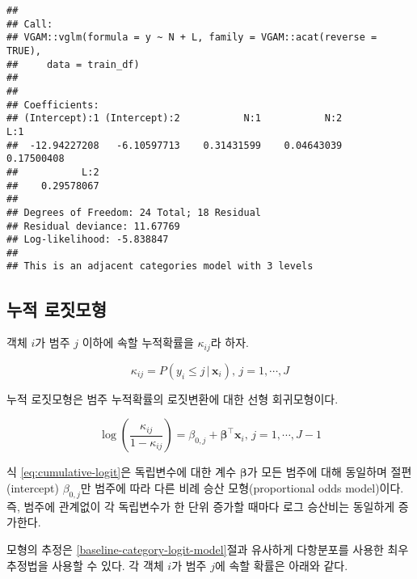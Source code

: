 \documentclass[]{book}
\begin{document}
\begin{verbatim}
## 
## Call:
## VGAM::vglm(formula = y ~ N + L, family = VGAM::acat(reverse = TRUE), 
##     data = train_df)
## 
## 
## Coefficients:
## (Intercept):1 (Intercept):2           N:1           N:2           L:1 
##  -12.94227208   -6.10597713    0.31431599    0.04643039    0.17500408 
##           L:2 
##    0.29578067 
## 
## Degrees of Freedom: 24 Total; 18 Residual
## Residual deviance: 11.67769 
## Log-likelihood: -5.838847 
## 
## This is an adjacent categories model with 3 levels
\end{verbatim}

\hypertarget{cumulative-logit-model}{%
\subsection{누적 로짓모형}\label{cumulative-logit-model}}

객체 \(i\)가 범주 \(j\) 이하에 속할 누적확률을 \(\kappa_{ij}\)라 하자.

\begin{equation*}
\kappa_{ij} = P(y_i \leq j \, | \, \mathbf{x}_i), \, j = 1, \cdots, J
\end{equation*}

누적 로짓모형은 범주 누적확률의 로짓변환에 대한 선형 회귀모형이다.

\begin{equation}
\log \left( \frac{\kappa_{ij}}{1 - \kappa_{ij}} \right) = \beta_{0,j} + \boldsymbol\beta^\top \mathbf{x}_i, \, j = 1, \cdots, J - 1
\label{eq:cumulative-logit}
\end{equation}

식 \eqref{eq:cumulative-logit}은 독립변수에 대한 계수 \(\boldsymbol\beta\)가 모든 범주에 대해 동일하며 절편(intercept) \(\beta_{0,j}\)만 범주에 따라 다른 비례 승산 모형(proportional odds model)이다. 즉, 범주에 관계없이 각 독립변수가 한 단위 증가할 때마다 로그 승산비는 동일하게 증가한다.

모형의 추정은 \ref{baseline-category-logit-model}절과 유사하게 다항분포를 사용한 최우추정법을 사용할 수 있다. 각 객체 \(i\)가 범주 \(j\)에 속할 확률은 아래와 같다.
\end{document}
